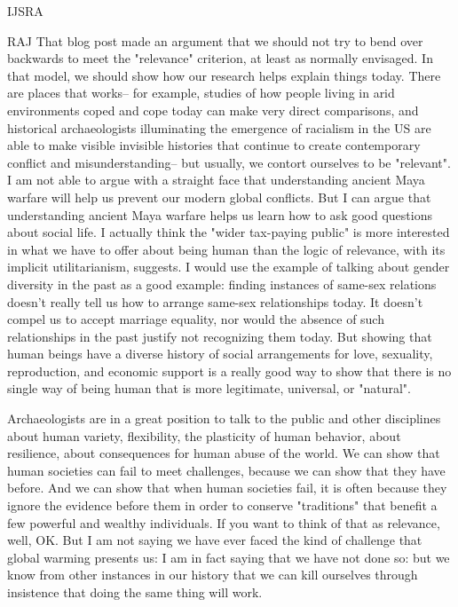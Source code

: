 \begin{labeling}{IJSRA}
\item[RAJ]That blog post made an argument that we should not try to bend over backwards to meet the "relevance" criterion, at least as normally envisaged. In that model, we should show how our research helps explain things today. There are places that works-- for example, studies of how people living in arid environments coped and cope today can make very direct comparisons, and historical archaeologists illuminating the emergence of racialism in the US are able to make visible invisible histories that continue to create contemporary conflict and misunderstanding-- but usually, we contort ourselves to be "relevant". I am not able to argue with a straight face that understanding ancient Maya warfare will help us prevent our modern global conflicts. But I can argue that understanding ancient Maya warfare helps us learn how to ask good questions about social life. I actually think the "wider tax-paying public" is more interested in what we have to offer about being human than the logic of relevance, with its implicit utilitarianism, suggests.  I would use the example of talking about gender diversity in the past as a good example: finding instances of same-sex relations doesn't really tell us how to arrange same-sex relationships today. It doesn't compel us to accept marriage equality, nor would the absence of such relationships in the past justify not recognizing them today. But showing that human beings have a diverse history of social arrangements for love, sexuality, reproduction, and economic support is a really good way to show that there is no single way of being human that is more legitimate, universal, or "natural". 

  Archaeologists are in a great position to talk to the public and other disciplines about human variety, flexibility, the plasticity of human behavior, about resilience, about consequences for human abuse of the world. We can show that human societies can fail to meet challenges, because we can show that they have before. And we can show that when human societies fail, it is often because they ignore the evidence before them in order to conserve "traditions" that benefit a few powerful and wealthy individuals. If you want to think of that as relevance, well, OK. But I am not saying we have ever faced the kind of challenge that global warming presents us: I am in fact saying that we have not done so: but we know from other instances in our history that we can kill ourselves through insistence that doing the same thing will work.

  \end{labeling}

